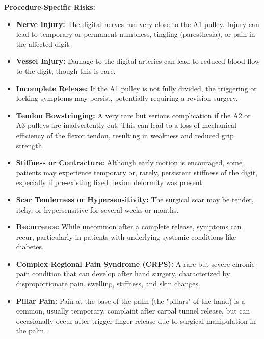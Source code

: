 \textbf{Procedure-Specific Risks:}
\begin{itemize}
  \item \textbf{Nerve Injury:} The digital nerves run very close to the A1 pulley. Injury can lead to temporary or permanent numbness, tingling (paresthesia), or pain in the affected digit.
  
  \item \textbf{Vessel Injury:} Damage to the digital arteries can lead to reduced blood flow to the digit, though this is rare.
  
  \item \textbf{Incomplete Release:} If the A1 pulley is not fully divided, the triggering or locking symptoms may persist, potentially requiring a revision surgery.
  
  \item \textbf{Tendon Bowstringing:} A very rare but serious complication if the A2 or A3 pulleys are inadvertently cut. This can lead to a loss of mechanical efficiency of the flexor tendon, resulting in weakness and reduced grip strength.
  
  \item \textbf{Stiffness or Contracture:} Although early motion is encouraged, some patients may experience temporary or, rarely, persistent stiffness of the digit, especially if pre-existing fixed flexion deformity was present.
  
  \item \textbf{Scar Tenderness or Hypersensitivity:} The surgical scar may be tender, itchy, or hypersensitive for several weeks or months.
  
  \item \textbf{Recurrence:} While uncommon after a complete release, symptoms can recur, particularly in patients with underlying systemic conditions like diabetes.
  
  \item \textbf{Complex Regional Pain Syndrome (CRPS):} A rare but severe chronic pain condition that can develop after hand surgery, characterized by disproportionate pain, swelling, stiffness, and skin changes.
  
  \item \textbf{Pillar Pain:} Pain at the base of the palm (the "pillars" of the hand) is a common, usually temporary, complaint after carpal tunnel release, but can occasionally occur after trigger finger release due to surgical manipulation in the palm.
\end{itemize}

